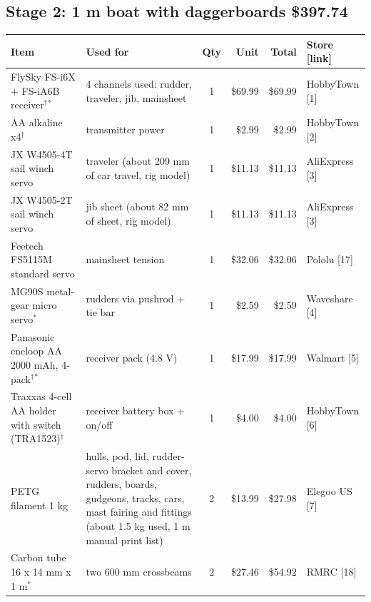 \documentclass[11pt]{article}
\begin{document}
\subsection*{Stage 2: 1 m boat with daggerboards \hfill \$397.74}
{\small
\begin{longtable}{L{4.1cm}L{4.5cm}crrl}
\toprule
Item & Used for & Qty & Unit & Total & Store [link] \\
\midrule\endhead
FlySky FS-i6X + FS-iA6B receiver$^\dagger$$^\ast$ & 4 channels used: rudder, traveler, jib, mainsheet & 1 & \$69.99 & \$69.99 & HobbyTown [1] \\
AA alkaline x4$^\dagger$ & transmitter power & 1 & \$2.99 & \$2.99 & HobbyTown [2] \\
JX W4505-4T sail winch servo & traveler (about 209 mm of car travel, rig model) & 1 & \$11.13 & \$11.13 & AliExpress [3] \\
JX W4505-2T sail winch servo & jib sheet (about 82 mm of sheet, rig model) & 1 & \$11.13 & \$11.13 & AliExpress [3] \\
Feetech FS5115M standard servo & mainsheet tension & 1 & \$32.06 & \$32.06 & Pololu [17] \\
MG90S metal-gear micro servo$^\ast$ & rudders via pushrod + tie bar & 1 & \$2.59 & \$2.59 & Waveshare [4] \\
Panasonic eneloop AA 2000 mAh, 4-pack$^\dagger$$^\ast$ & receiver pack (4.8 V) & 1 & \$17.99 & \$17.99 & Walmart [5] \\
Traxxas 4-cell AA holder with switch (TRA1523)$^\dagger$ & receiver battery box + on/off & 1 & \$4.00 & \$4.00 & HobbyTown [6] \\
PETG filament 1 kg & hulls, pod, lid, rudder-servo bracket and cover, rudders, boards, gudgeons, tracks, cars, mast fairing and fittings (about 1.5 kg used, 1 m manual print list) & 2 & \$13.99 & \$27.98 & Elegoo US [7] \\
Carbon tube 16 x 14 mm x 1 m$^\ast$ & two 600 mm crossbeams & 2 & \$27.46 & \$54.92 & RMRC [18] \\

\end{longtable}}
\end{document}
